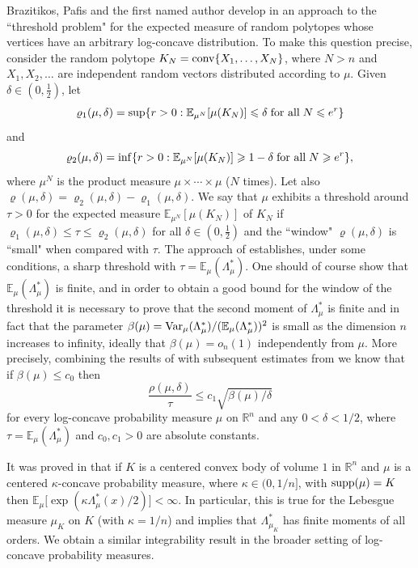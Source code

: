 \documentclass[11pt,leqno]{article}
\theoremstyle{definition}
\theoremstyle{remark}
\numberwithin{equation}{section}
\newcommand{\ls}{\leqslant}
\newcommand{\gr}{\geqslant}
\newcommand{\1}{\textbf{1}}
\begin{document}
Brazitikos, Pafis and the first named author develop in \cite{BGP-threshold} an approach to the ``threshold
problem" for the expected measure of random polytopes whose vertices have an arbitrary log-concave distribution.
To make this question precise, consider the random polytope $K_N={\rm conv}\{X_1,\ldots ,X_N\}$, where $N>n$ and
$X_1,X_2,\ldots $ are independent random vectors distributed according to $\mu$. Given $\delta\in\left(0,\frac{1}{2}\right)$, let
$$\varrho_1(\mu,\delta)=\sup\{r>0:\mathbb{E}_{\mu^N}[\mu(K_N)]\ls\delta\;\hbox{for all}\; N\ls e^r\}$$
and
$$\varrho_2(\mu,\delta)=\inf\{r>0:\mathbb{E}_{\mu^N}[\mu(K_N)]\gr 1-\delta\;\hbox{for all}\; N\gr e^r\},$$
where $\mu^N$ is the product measure $\mu\times\cdots\times\mu$ ($N$ times). Let also $\varrho(\mu,\delta)=\varrho_2(\mu,\delta)-\varrho_1(\mu,\delta)$. We say that $\mu$ exhibits a threshold around
$\tau>0$ for the expected measure ${\mathbb E}_{\mu^N}[\mu (K_N)]$ of $K_N$ if $\varrho_1(\mu,\delta)\ls \tau\ls\varrho_2(\mu,\delta)$
for all $\delta\in\left(0,\frac{1}{2}\right)$ and the ``window" $\varrho(\mu,\delta)$ is ``small" when compared
with $\tau$. The approach of \cite{BGP-threshold} establishes, under some conditions, a sharp threshold
with $\tau ={\mathbb E}_{\mu }(\Lambda_{\mu}^{\ast })$. One should of course show that
${\mathbb E}_{\mu }(\Lambda_{\mu}^{\ast })$ is finite, and in order to obtain a good bound for the window
of the threshold it is necessary to prove that the second moment of $\Lambda_{\mu}^{\ast }$ is finite and in fact
that the parameter $\beta(\mu)={\rm Var}_{\mu }(\Lambda_{\mu}^{\ast })/({\mathbb E}_{\mu }(\Lambda_{\mu }^{\ast }))^2$ is small
as the dimension $n$ increases to infinity, ideally that $\beta(\mu)=o_n(1)$ independently from $\mu$. More precisely,
combining the results of \cite{BGP-threshold} with subsequent estimates from \cite{Brazitikos-Chasapis-2024} we know that
if $\beta(\mu)\ls c_0$ then
$$\frac{\rho(\mu,\delta)}{\tau}\ls c_1\sqrt{\beta(\mu)/\delta}$$
for every log-concave probability measure $\mu$ on $\mathbb{R}^n$ and any $0<\delta<1/2$, where
$\tau=\mathbb{E}_{\mu}(\Lambda_{\mu}^{\ast})$ and $c_0,c_1>0$ are absolute constants.

It was proved in \cite{BGP-threshold} that if $K$ is a centered convex body of volume $1$ in ${\mathbb R}^n$
and $\mu$ is a centered $\kappa$-concave probability measure, where $\kappa\in (0,1/n]$, with ${\rm supp}(\mu)=K$
then ${\mathbb E}_{\mu}\big[\exp(\kappa \Lambda_{\mu}^{\ast }(x)/2)\big]<\infty $. In particular, this is true
for the Lebesgue measure $\mu_K$ on $K$ (with $\kappa =1/n$) and implies that $\Lambda_{\mu_K}^{\ast}$ has finite moments
of all orders. We obtain a similar integrability result in the broader setting of
log-concave probability measures.
\end{document}
